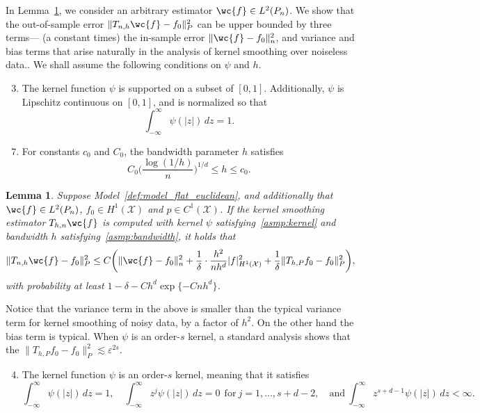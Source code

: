 \documentclass{article}
\newcommand{\1}{\mathbf{1}}
\newcommand{\mc}[1]{\mathcal{#1}}
\theoremstyle{alden}
\theoremstyle{aldenthm}
\newtheorem{lemma}{Lemma}
\theoremstyle{definition}
\theoremstyle{remark}
\begin{document}
In Lemma~\ref{lem:kernel_smoothing_insample}, we consider an arbitrary estimator $\wc{f} \in L^2(P_n)$. We show that the out-of-sample error $\|T_{n,h}\wc{f} - f_0\|_P^2$ can be upper bounded by three terms--- (a constant times) the in-sample error $\|\wc{f} - f_0\|_n^2$, and variance and bias terms that arise naturally in the analysis of kernel smoothing over noiseless data.. We shall assume the following conditions on $\psi$ and $h$.
\begin{enumerate}[label=(K\arabic*)]
	\setcounter{enumi}{2}
	\item
	\label{asmp:kernel}
	The kernel function $\psi$ is supported on a subset of $[0,1]$. Additionally, $\psi$ is Lipschitz continuous on $[0,1]$, and is normalized so that
	\begin{equation*}
	\int_{-\infty}^{\infty} \psi(|z|) \,dz = 1.
	\end{equation*}
\end{enumerate}
\begin{enumerate}[label=(P\arabic*)]
	\setcounter{enumi}{6}
	\item
	\label{asmp:bandwidth}
	For constants $c_0$ and $C_0$, the bandwidth parameter $h$ satisfies
	\begin{equation*}
	C_0\biggl(\frac{\log(1/h)}{n}\biggr)^{1/d} \leq h \leq c_0.
	\end{equation*}
\end{enumerate}
\begin{lemma}
	\label{lem:kernel_smoothing_insample}
	Suppose Model~\ref{def:model_flat_euclidean}, and additionally that $\wc{f} \in L^2(P_n)$, $f_0 \in H^1(\mc{X})$ and $p \in C^1(\mc{X})$. If the kernel smoothing estimator $T_{h,n}\wc{f}$ is computed with kernel $\psi$ satisfying~\ref{asmp:kernel} and bandwidth $h$ satisfying~\ref{asmp:bandwidth}, it holds that
	\begin{equation}
	\label{eqn:kernel_smoothing_insample}
	\|T_{n,h}\wc{f} - f_0\|_P^2 \leq C\biggl(\|\wc{f} - f_0\|_n^2 + \frac{1}{\delta} \cdot \frac{h^2}{nh^d} |f|_{H^1(\mc{X})}^2 + \frac{1}{\delta}\|T_{h,P}f_0 - f_0\|_P^2\biggr),
	\end{equation}
	with probability at least $1 - \delta - Ch^d\exp\{-Cnh^d\}$. 
\end{lemma}
Notice that the variance term in the above is smaller than the typical variance term for kernel smoothing of noisy data, by a factor of $h^2$. On the other hand the bias term is typical. When $\psi$ is an order-$s$ kernel, a standard analysis shows that the $\|T_{h,P}f_0 - f_0\|_P^2 \lesssim \varepsilon^{2s}$.
\begin{enumerate}[label=(K\arabic*)]
	\setcounter{enumi}{3}
	\item
	\label{asmp:ho_kernel}
	The kernel function $\psi$ is an order-$s$ kernel, meaning that it satisfies
	\begin{equation*}
	\int_{-\infty}^{\infty} \psi(|z|) \,dz = 1, \quad \int_{-\infty}^{\infty} z^j \psi(|z|) \,dz = 0 ~~\textrm{for}~j = 1,\ldots, s + d - 2, \quad \textrm{and}~ \int_{-\infty}^{\infty} z^{s + d - 1} \psi(|z|) \,dz < \infty. 
	\end{equation*}
\end{enumerate}
\end{document}
